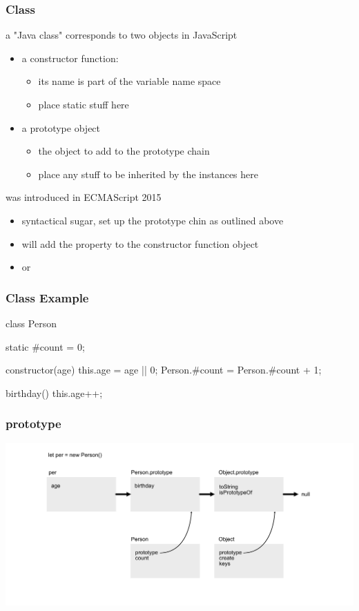 \begin{frame}[fragile] \frametitle{Class}
a "Java class" corresponds to two objects in JavaScript
\begin{itemize}
  \item a constructor function:
  \begin{itemize}
    \item its name is part of the variable name space
    \item place static stuff here
  \end{itemize}
  \item a prototype object
  \begin{itemize}
    \item the object to add to the prototype chain
    \item place any stuff to be inherited by the instances here
  \end{itemize}
\end{itemize}
\vspace{5mm}

 was introduced in ECMAScript 2015
\begin{itemize}
  \item syntactical sugar, set up the prototype chin as outlined above
  \item {} will add the property to the constructor function object
  \item {} or 
\end{itemize}
\end{frame}
\begin{frame}[fragile] \frametitle{Class Example}
\begin{CodeBox}{}
class Person {
  static #count = 0;

  constructor(age) {
    this.age = age || 0;
    Person.#count = Person.#count + 1;
  }

  birthday() {
    this.age++;
  }
}
\end{CodeBox}
\end{frame}

\begin{frame}[fragile] \frametitle{prototype}
  \centering
  \includegraphics[width=14cm]{img/prototype_chain6}
\end{frame}


